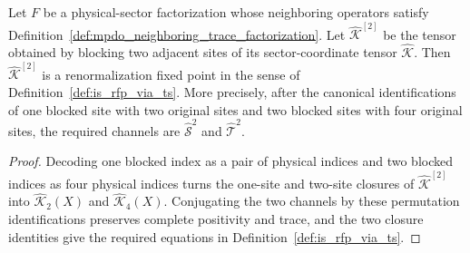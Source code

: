 \begin{lemma}
    \label{thm:mpdo_blocked_sector_coordinate_tensor_is_rfp_via_ts}
    \leanok
    Let $F$ be a physical-sector factorization whose neighboring operators
    satisfy Definition~\ref{def:mpdo_neighboring_trace_factorization}. Let
    $\widehat{\mathcal K}^{[2]}$ be the tensor obtained by blocking two
    adjacent sites of its sector-coordinate tensor $\widehat{\mathcal K}$.
    Then $\widehat{\mathcal K}^{[2]}$ is a renormalization fixed point in the
    sense of Definition~\ref{def:is_rfp_via_ts}. More precisely, after the
    canonical identifications of one blocked site with two original sites and
    two blocked sites with four original sites, the required channels are
    $\widehat{\mathcal S}^2$ and $\widehat{\mathcal T}^2$.
\end{lemma}

\begin{proof}\leanok
    Decoding one blocked index as a pair of physical indices and two blocked
    indices as four physical indices turns the one-site and two-site closures of
    $\widehat{\mathcal K}^{[2]}$ into
    $\widehat{\mathcal K}_2(X)$ and $\widehat{\mathcal K}_4(X)$.
    Conjugating the two channels by these permutation identifications
    preserves complete positivity and trace, and the two closure identities
    give the required equations in Definition~\ref{def:is_rfp_via_ts}.
\end{proof}

